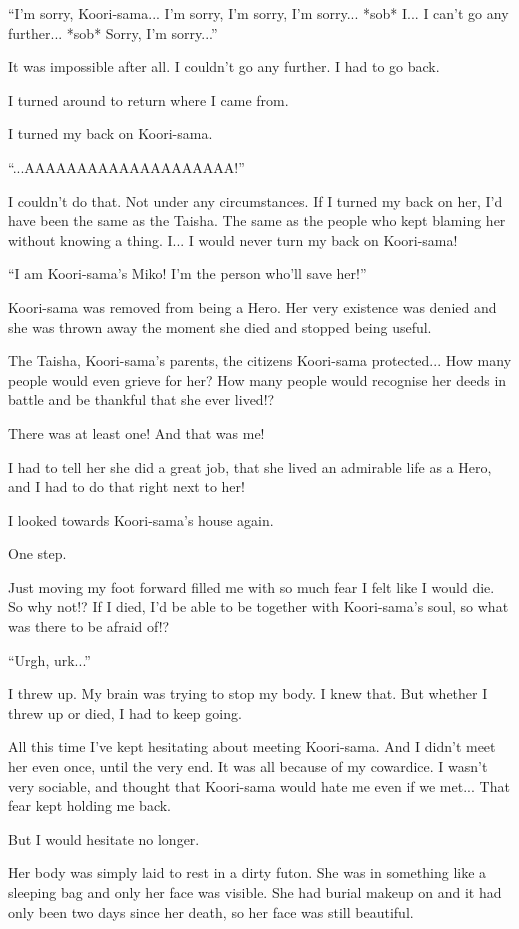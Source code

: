 ``I'm sorry, Koori-sama... I'm sorry, I'm sorry, I'm sorry... *sob* I... I can't go any further... *sob* Sorry, I'm sorry...''

It was impossible after all. I couldn't go any further. I had to go back.

I turned around to return where I came from.

I turned my back on Koori-sama.

``...AAAAAAAAAAAAAAAAAAAA!''

I couldn't do that. Not under any circumstances. If I turned my back on her, I'd have been the same as the Taisha. The same as the people who kept blaming her without knowing a thing. I... I would never turn my back on Koori-sama!

``I am Koori-sama's Miko! I'm the person who'll save her!''

Koori-sama was removed from being a Hero. Her very existence was denied and she was thrown away the moment she died and stopped being useful.

The Taisha, Koori-sama's parents, the citizens Koori-sama protected... How many people would even grieve for her? How many people would recognise her deeds in battle and be thankful that she ever lived!?

There was at least one! And that was me!

I had to tell her she did a great job, that she lived an admirable life as a Hero, and I had to do that right next to her!

I looked towards Koori-sama's house again.

One step.

Just moving my foot forward filled me with so much fear I felt like I would die. So why not!? If I died, I'd be able to be together with Koori-sama's soul, so what was there to be afraid of!?

``Urgh, urk...''

I threw up. My brain was trying to stop my body. I knew that. But whether I threw up or died, I had to keep going.

All this time I've kept hesitating about meeting Koori-sama. And I didn't meet her even once, until the very end. It was all because of my cowardice. I wasn't very sociable, and thought that Koori-sama would hate me even if we met... That fear kept holding me back.

But I would hesitate no longer.

Her body was simply laid to rest in a dirty futon. She was in something like a sleeping bag and only her face was visible. She had burial makeup on and it had only been two days since her death, so her face was still beautiful.

